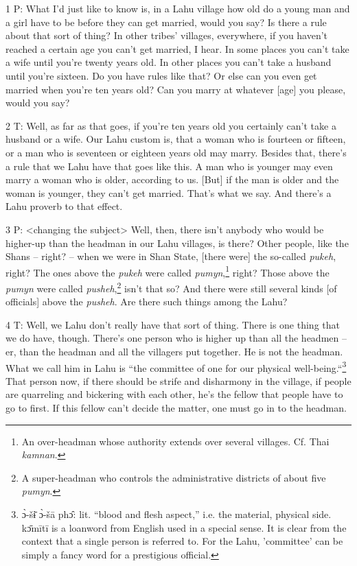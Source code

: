 
1 P: What I'd just like to know is, in a Lahu village how old do a young man and
a girl have to be before they can get married, would you say? Is there a rule about
that sort of thing? In other tribes' villages, everywhere, if you haven't reached
a certain age you can't get married, I hear. In some places you can't take a wife
until you're twenty years old. In other places you can't take a husband until you're
sixteen. Do you have rules like that? Or else can you even get married when you're
ten years old? Can you marry at whatever [age] you please, would you say?

2 T: Well, as far as that goes, if you're ten years old you certainly can't take
a husband or a wife. Our Lahu custom is, that a woman who is fourteen or fifteen,
or a man who is seventeen or eighteen years old may marry. Besides that, there's
a rule that we Lahu have that goes like this. A man who is younger may even marry
a woman who is older, according to us. [But] if the man is older and the woman
is younger, they can't get married. That's what we say. And there's a Lahu proverb
to that effect.

3 P: <changing the subject> Well, then, there isn't anybody who
would be higher-up than the headman in our Lahu villages, is there? Other people,
like the Shans -- right? -- when we were in Shan State, [there were] the so-called
\textit{pukeh}, right? The ones above the \textit{pukeh} were called \textit{pumyn},\footnote{An over-headman whose authority extends over several villages. Cf. Thai \textit{kamnan}.}
right? Those above the \textit{pumyn} were called \textit{pusheh},\footnote{A super-headman who controls the administrative districts of about five \textit{pumyn}.} isn't that
so? And there were still several kinds [of officials] above the \textit{pusheh}.
Are there such things among the Lahu?

4 T: Well, we Lahu don't really have that sort of thing. There is one thing that
we do have, though. There's one person who is higher up than all the headmen --
er, than the headman and all the villagers put together. He is not the headman.
What we call him in Lahu is ``the committee of one for our physical well-being.``\footnote{ɔ̀-šɨ̄ ɔ̀-šā phɔ̂: lit. ``blood and flesh aspect,'' i.e. the material, physical side. kɔ̄mītī is a loanword from English used in a special sense. It is clear from the context that a single person is referred to. For the Lahu, 'committee' can be simply a fancy word for a prestigious official.}
That person now, if there should be strife and disharmony in the village, if people
are quarreling and bickering with each other, he's the fellow that people have
to go to first. If this fellow can't decide the matter, one must go in to the headman.

